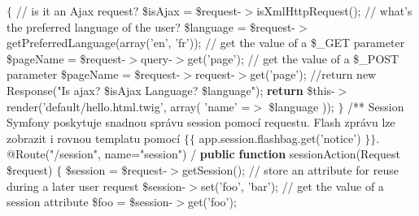  $\{$\codetexNewline
{} {\localcolor \Grey // is it an Ajax request?}\codetexNewline
{} \$isAjax = \$request-$>$isXmlHttpRequest();\codetexNewline
{} \codetexNewline
{} {\localcolor \Grey // what's the preferred language of the user?}\codetexNewline
{} \$language = \$request-$>$getPreferredLanguage(array({\localcolor \Cyan 'en'}, {\localcolor \Cyan 'fr'}));\codetexNewline
{} \codetexNewline
{} {\localcolor \Grey // get the value of a \$\_GET parameter}\codetexNewline
{} \$pageName = \$request-$>$query-$>$get({\localcolor \Cyan 'page'});\codetexNewline
{} \codetexNewline
{} {\localcolor \Grey // get the value of a \$\_POST parameter}\codetexNewline
{} \$pageName = \$request-$>$request-$>$get({\localcolor \Cyan 'page'});\codetexNewline
{} \codetexNewline
{} {\localcolor \Grey //return new Response("Is ajax? \$isAjax  Language? \$language");}\codetexNewline
{} {\bf {\localcolor \Green return}} \$this-$>$render({\localcolor \Cyan 'default/hello.html.twig'}, array(\codetexNewline
{} {\localcolor \Cyan 'name'} =$>$ \$language\codetexNewline
{} ));\codetexNewline
{} $\}$\codetexNewline
{} \codetexNewline
{} {\localcolor \Grey /**}\codetexNewline
{} {\localcolor \Grey * Session}\codetexNewline
{} {\localcolor \Grey * Symfony poskytuje snadnou správu session pomocí requestu.}\codetexNewline
{} {\localcolor \Grey * Flash zprávu lze zobrazit i rovnou templatu pomocí $\{$$\{$ app.session.flashbag.get('notice') $\}$$\}$.}\codetexNewline
{} {\localcolor \Grey *}\codetexNewline
{} {\localcolor \Grey * @Route("/session", name="session")}\codetexNewline
{} {\localcolor \Grey */}\codetexNewline
{} {\bf {\localcolor \Green public}} {\bf {\localcolor \Green function}} sessionAction(Request \$request)\codetexNewline
{} $\{$\codetexNewline
{} \$session = \$request-$>$getSession();\codetexNewline
{} \codetexNewline
{} {\localcolor \Grey // store an attribute for reuse during a later user request}\codetexNewline
{} \$session-$>$set({\localcolor \Cyan 'foo'}, {\localcolor \Cyan 'bar'});\codetexNewline
{} \codetexNewline
{} {\localcolor \Grey // get the value of a session attribute}\codetexNewline
{} \$foo = \$session-$>$get({\localcolor \Cyan 'foo'});\codetexNewline
